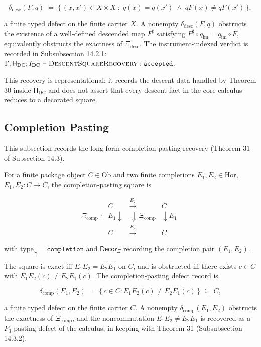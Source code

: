 \documentclass[11pt]{article}
\theoremstyle{definition}
\begin{document}
\[
\delta_{\mathrm{desc}}(F,q)\;=\;\{\,(x,x')\in X\times X\;:\;q(x)=q(x')\;\land\;qF(x)\neq qF(x')\,\},
\]

a finite typed defect on the finite carrier \(X\). A nonempty \(\delta_{\mathrm{desc}}(F,q)\) obstructs the existence of a well-defined descended map \(F^{\sharp}\) satisfying \(F^{\sharp}\circ q_{\mathrm{im}}=q_{\mathrm{im}}\circ F\), equivalently obstructs the exactness of \(\Xi_{\mathrm{desc}}\). The instrument-indexed verdict is recorded in Subsubsection 14.2.1: \(\Gamma;\mathsf H_{\mathrm{DC}};I_{\mathrm{DC}}\vdash\textsc{DescentSquareRecovery}:\texttt{accepted}\).

This recovery is representational: it records the descent data handled by Theorem 30 inside \(\mathsf H_{\mathrm{DC}}\) and does not assert that every descent fact in the core calculus reduces to a decorated square.

\subsection{Completion Pasting}

This subsection records the long-form completion-pasting recovery (Theorem 31 of Subsection 14.3).

For a finite package object \(C\in\mathrm{Ob}\) and two finite completions \(E_{1},E_{2}\in\mathrm{Hor}\), \(E_{1},E_{2}:C\to C\), the completion-pasting square is

\[
\Xi_{\mathrm{comp}}\;:\;
\begin{array}{ccc}
C & \xrightarrow{E_{2}} & C\\
{\scriptstyle E_{1}}\downarrow & \Downarrow\,\Xi_{\mathrm{comp}} & \downarrow{\scriptstyle E_{1}}\\
C & \xrightarrow{E_{2}} & C
\end{array}
\]

with \(\mathrm{type}_{\Xi}=\texttt{completion}\) and \(\mathsf{Decor}_{\Xi}\) recording the completion pair \((E_{1},E_{2})\).

The square is exact iff \(E_{1}E_{2}=E_{2}E_{1}\) on \(C\), and is obstructed iff there exists \(c\in C\) with \(E_{1}E_{2}(c)\neq E_{2}E_{1}(c)\). The completion-pasting defect record is

\[
\delta_{\mathrm{comp}}(E_{1},E_{2})\;=\;\{\,c\in C:E_{1}E_{2}(c)\neq E_{2}E_{1}(c)\,\}\;\subseteq\;C,
\]

a finite typed defect on the finite carrier \(C\). A nonempty \(\delta_{\mathrm{comp}}(E_{1},E_{2})\) obstructs the exactness of \(\Xi_{\mathrm{comp}}\), and the noncommutation \(E_{1}E_{2}\neq E_{2}E_{1}\) is recovered as a \(P_{3}\)-pasting defect of the calculus, in keeping with Theorem 31 (Subsubsection 14.3.2).
\end{document}
